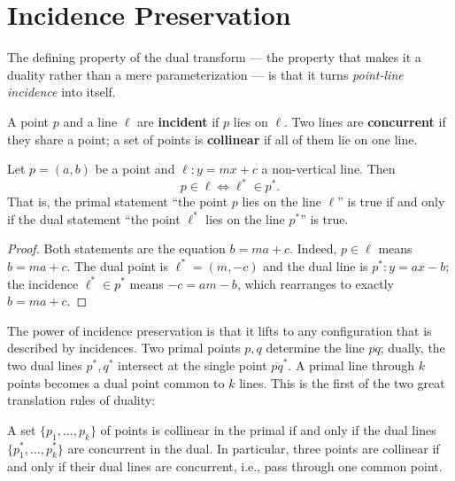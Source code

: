 
\section{Incidence Preservation}
\label{sec:duality_incidence}

The defining property of the dual transform --- the property that makes it a
duality rather than a mere parameterization --- is that it turns
\emph{point-line incidence} into itself.

\begin{definition}[Incidence]\label{def:geo_duality_incidence}
  A point $p$ and a line $\ell$ are \textbf{incident} if $p$ lies on
  $\ell$. Two lines are \textbf{concurrent} if they share a point; a set of
  points is \textbf{collinear} if all of them lie on one line.
\end{definition}

\begin{theorem}\label{thm:geo_duality_incidence}
  Let $p = (a,b)$ be a point and $\ell : y = mx + c$ a non-vertical line.
  Then
  \[
    p \in \ell \iff \ell^* \in p^* .
  \]
  That is, the primal statement ``the point $p$ lies on the line $\ell$''
  is true if and only if the dual statement ``the point $\ell^*$ lies on the
  line $p^*$'' is true.
\end{theorem}

\begin{proof}
  Both statements are the equation $b = ma + c$. Indeed, $p \in \ell$ means
  $b = ma + c$. The dual point is $\ell^* = (m, -c)$ and the dual line is
  $p^* : y = ax - b$; the incidence $\ell^* \in p^*$ means
  $-c = a m - b$, which rearranges to exactly $b = ma + c$.
\end{proof}

The power of incidence preservation is that it lifts to any configuration
that is described by incidences. Two primal points $p,q$ determine the line
$\overline{pq}$; dually, the two dual lines $p^*, q^*$ intersect at the
single point $\overline{pq}^*$. A primal line through $k$ points becomes a
dual point common to $k$ lines. This is the first of the two great
translation rules of duality:

\begin{corollary}\label{cor:geo_duality_collinear_concurrent}
  A set $\{p_1, \dots, p_k\}$ of points is collinear in the primal if and
  only if the dual lines $\{p_1^*, \dots, p_k^*\}$ are concurrent in the
  dual. In particular, three points are collinear if and only if their dual
  lines are concurrent, i.e., pass through one common point.
\end{corollary}

